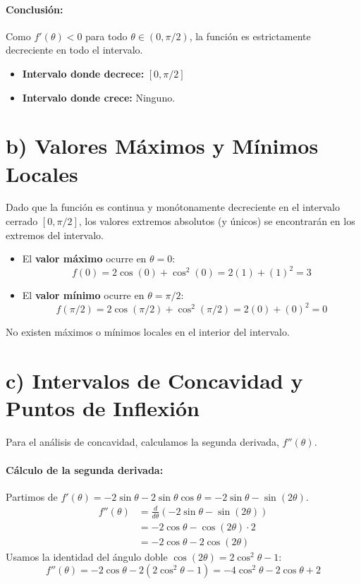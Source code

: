 \documentclass[12pt, letterpaper]{article}
\begin{document}
\paragraph{Conclusión:}
Como $f'(\theta) < 0$ para todo $\theta \in (0, \pi/2)$, la función es estrictamente decreciente en todo el intervalo.
\begin{itemize}
    \item \textbf{Intervalo donde decrece:} $[0, \pi/2]$
    \item \textbf{Intervalo donde crece:} Ninguno.
\end{itemize}


\section*{b) Valores Máximos y Mínimos Locales}
Dado que la función es continua y monótonamente decreciente en el intervalo cerrado $[0, \pi/2]$, los valores extremos absolutos (y únicos) se encontrarán en los extremos del intervalo.

\begin{itemize}
    \item El \textbf{valor máximo} ocurre en $\theta = 0$:
    $$ f(0) = 2\cos(0) + \cos^2(0) = 2(1) + (1)^2 = 3 $$
    \item El \textbf{valor mínimo} ocurre en $\theta = \pi/2$:
    $$ f(\pi/2) = 2\cos(\pi/2) + \cos^2(\pi/2) = 2(0) + (0)^2 = 0 $$
\end{itemize}
No existen máximos o mínimos locales en el interior del intervalo.

\section*{c) Intervalos de Concavidad y Puntos de Inflexión}
Para el análisis de concavidad, calculamos la segunda derivada, $f''(\theta)$.

\paragraph{Cálculo de la segunda derivada:}
Partimos de $f'(\theta) = -2\sin\theta - 2\sin\theta\cos\theta = -2\sin\theta - \sin(2\theta)$.
\begin{align*}
f''(\theta) &= \frac{d}{d\theta}(-2\sin\theta - \sin(2\theta)) \\
&= -2\cos\theta - \cos(2\theta) \cdot 2 \\
&= -2\cos\theta - 2\cos(2\theta)
\end{align*}
Usamos la identidad del ángulo doble $\cos(2\theta) = 2\cos^2\theta - 1$:
$$ f''(\theta) = -2\cos\theta - 2(2\cos^2\theta - 1) = -4\cos^2\theta - 2\cos\theta + 2 $$
\end{document}

